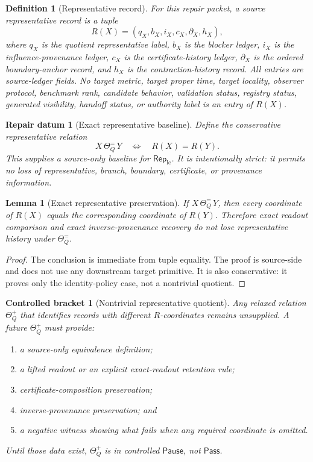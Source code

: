 \documentclass[11pt]{article}
\newcommand{\RepLC}{\mathsf{Rep}_{\mathrm{lc}}}
\newcommand{\Pass}{\mathsf{Pass}}
\newcommand{\Pause}{\mathsf{Pause}}
\newtheorem{definition}{Definition}
\newtheorem{repair}{Repair datum}
\newtheorem{bracket}{Controlled bracket}
\newtheorem{lemma}{Lemma}
\begin{document}
\begin{definition}[Representative record]
For this repair packet, a source representative record is a tuple
\[
R(X)=
(q_X,b_X,i_X,c_X,\partial_X,h_X),
\]
where \(q_X\) is the quotient representative label, \(b_X\) is the
blocker ledger, \(i_X\) is the influence-provenance ledger, \(c_X\)
is the certificate-history ledger, \(\partial_X\) is the ordered
boundary-anchor record, and \(h_X\) is the contraction-history record.
All entries are source-ledger fields. No target metric, target proper
time, target locality, observer protocol, benchmark rank, candidate
behavior, validation status, registry status, generated visibility,
handoff status, or authority label is an entry of \(R(X)\).
\end{definition}

\begin{repair}[Exact representative baseline]
Define the conservative representative relation
\[
X \,\Theta_Q^{=}\, Y
\quad\Longleftrightarrow\quad
R(X)=R(Y).
\]
This supplies a source-only baseline for \(\RepLC\). It is intentionally
strict: it permits no loss of representative, branch, boundary,
certificate, or provenance information.
\end{repair}

\begin{lemma}[Exact representative preservation]
If \(X \,\Theta_Q^{=}\, Y\), then every coordinate of \(R(X)\) equals
the corresponding coordinate of \(R(Y)\). Therefore exact readout
comparison and exact inverse-provenance recovery do not lose
representative history under \(\Theta_Q^{=}\).
\end{lemma}

\begin{proof}
The conclusion is immediate from tuple equality. The proof is
source-side and does not use any downstream target primitive. It is
also conservative: it proves only the identity-policy case, not a
nontrivial quotient.
\end{proof}

\begin{bracket}[Nontrivial representative quotient]
Any relaxed relation \(\Theta_Q^{+}\) that identifies records with
different \(R\)-coordinates remains unsupplied. A future
\(\Theta_Q^{+}\) must provide:
\begin{enumerate}
    \item a source-only equivalence definition;
    \item a lifted readout or an explicit exact-readout retention rule;
    \item certificate-composition preservation;
    \item inverse-provenance preservation; and
    \item a negative witness showing what fails when any required
    coordinate is omitted.
\end{enumerate}
Until those data exist, \(\Theta_Q^{+}\) is in controlled \(\Pause\),
not \(\Pass\).
\end{bracket}
\end{document}
